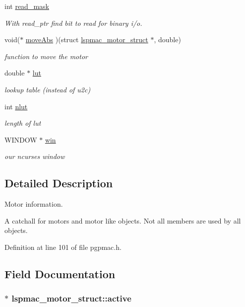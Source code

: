 \begin{DoxyCompactItemize}
int \hyperlink{structlspmac__motor__struct_a3c24ed30c5a3ad490c6139b2780b2af7}{read\-\_\-mask}
\begin{DoxyCompactList}\small\item\em With read\-\_\-ptr find bit to read for binary i/o. \end{DoxyCompactList}\item 
void($\ast$ \hyperlink{structlspmac__motor__struct_a20db3de86854b627815b3d940555ea75}{move\-Abs} )(struct \hyperlink{structlspmac__motor__struct}{lspmac\-\_\-motor\-\_\-struct} $\ast$, double)
\begin{DoxyCompactList}\small\item\em function to move the motor \end{DoxyCompactList}\item 
double $\ast$ \hyperlink{structlspmac__motor__struct_a7b43671f7f3e06521f6cf91fb9ac707d}{lut}
\begin{DoxyCompactList}\small\item\em lookup table (instead of u2c) \end{DoxyCompactList}\item 
int \hyperlink{structlspmac__motor__struct_a11cbc6f50c150ed446e9a901cf7cc12b}{nlut}
\begin{DoxyCompactList}\small\item\em length of lut \end{DoxyCompactList}\item 
W\-I\-N\-D\-O\-W $\ast$ \hyperlink{structlspmac__motor__struct_a133775154b0e008f3a2fde6f53bc0eff}{win}
\begin{DoxyCompactList}\small\item\em our ncurses window \end{DoxyCompactList}\end{DoxyCompactItemize}


\subsection{Detailed Description}
Motor information. 

A catchall for motors and motor like objects. Not all members are used by all objects. 

Definition at line 101 of file pgpmac.\-h.



\subsection{Field Documentation}
\hypertarget{structlspmac__motor__struct_aed4998885bcd5a2a30069637180f58e3}{
\subsubsection[{active}]{$\ast$ lspmac\-\_\-motor\-\_\-struct\-::active}}\label{structlspmac__motor__struct_aed4998885bcd5a2a30069637180f58e3}


